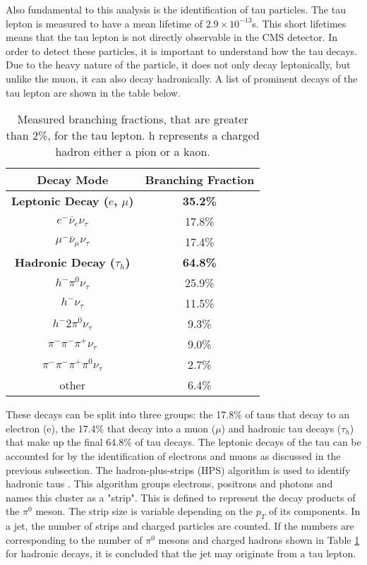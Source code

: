 Also fundamental to this analysis is the identification of tau particles. The tau lepton is measured to have a mean lifetime of \(2.9 \times 10^{-13}\)s. This short lifetimes means that the tau lepton is not directly observable in the CMS detector.  In order to detect these particles, it is important to understand how the tau decays. Due to the heavy nature of the particle, it does not only decay leptonically, but unlike the muon, it can also decay hadronically. A list of prominent decays of the tau lepton are shown in the table below.

\begin{table}[h]
    \centering
    \begin{tabular}{|c|c|}
         \hline
         Decay Mode & Branching Fraction  \\
         \hline
         \hline
         \textbf{Leptonic Decay (\(e\), \(\mu\))} & \textbf{35.2\%} \\
         \(e^- \bar{\nu}_e \nu_\tau \) & 17.8\% \\
         \(\mu^- \bar{\nu}_\mu \nu_\tau \) & 17.4\% \\
         \hline
         \textbf{Hadronic Decay (\(\tau_h\))} & \textbf{64.8\%} \\
         \(h^- \pi^0 \nu_\tau \) & 25.9\% \\
         \(h^- \nu_\tau\) & 11.5\% \\
         \(h^- 2\pi^0 \nu_\tau\) & 9.3\% \\
         \(\pi^- \pi^- \pi^+ \nu_\tau\) & 9.0\% \\
         \(\pi^- \pi^- \pi^+ \pi^0 \nu_\tau\) & 2.7\% \\
         other & 6.4\% \\
         \hline
    \end{tabular}
    \caption{Measured branching fractions, that are greater than 2\%, for the tau lepton. h represents a charged hadron either a pion or a kaon.}
    \label{tab:tau_decay}
\end{table}

These decays can be split into three groups: the 17.8\% of taus that decay to an electron (e), the 17.4\% that decay into a muon (\(\mu\)) and hadronic tau decays (\(\tau_h\)) that make up the final 64.8\% of tau decays. The leptonic decays of the tau can be accounted for by the identification of electrons and muons as discussed in the previous subsection. The hadron-plus-strips (HPS) algorithm is used to identify hadronic taus \cite{CMS_hps1,CMS_hps2}. This algorithm groups electrons, positrons and photons and names this cluster as a "strip". This is defined to represent the decay products of the \(\pi^0\) meson. The strip size is variable depending on the \(p_T\) of its components. In a jet, the number of strips and charged particles are counted. If the numbers are corresponding to the number of \(\pi^0\) mesons and charged hadrons shown in Table \ref{tab:tau_decay} for hadronic decays, it is concluded that the jet may originate from a tau lepton. \\

